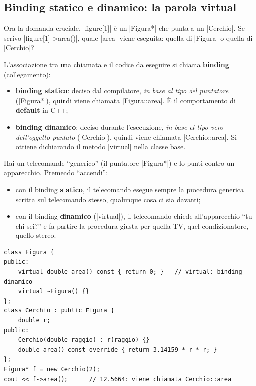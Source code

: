 \subsection*{Binding statico e dinamico: la parola virtual}

Ora la domanda cruciale. \cc|figure[1]| è un \cc|Figura*| che punta a un \cc|Cerchio|.
Se scrivo \cc|figure[1]->area()|, quale \cc|area| viene eseguita: quella di
\cc|Figura| o quella di \cc|Cerchio|?

L'associazione tra una chiamata e il codice da eseguire si chiama \textbf{binding}
(collegamento):
\begin{itemize}
  \item \textbf{binding statico}: deciso dal compilatore, \emph{in base al tipo del
        puntatore} (\cc|Figura*|), quindi viene chiamata \cc|Figura::area|. È il
        comportamento di \textbf{default} in C++;
  \item \textbf{binding dinamico}: deciso durante l'esecuzione, \emph{in base al tipo
        vero dell'oggetto puntato} (\cc|Cerchio|), quindi viene chiamata
        \cc|Cerchio::area|. Si ottiene dichiarando il metodo \cc|virtual| nella classe base.
\end{itemize}

\begin{analogia}
Hai un telecomando ``generico'' (il puntatore \cc|Figura*|) e lo punti contro un
apparecchio. Premendo ``accendi'':
\begin{itemize}
  \item con il binding \textbf{statico}, il telecomando esegue sempre la procedura
        generica scritta sul telecomando stesso, qualunque cosa ci sia davanti;
  \item con il binding \textbf{dinamico} (\cc|virtual|), il telecomando chiede
        all'apparecchio ``tu chi sei?'' e fa partire la procedura giusta per quella TV,
        quel condizionatore, quello stereo.
\end{itemize}
\end{analogia}

\begin{lstlisting}
class Figura {
public:
    virtual double area() const { return 0; }   // virtual: binding dinamico
    virtual ~Figura() {}
};
class Cerchio : public Figura {
    double r;
public:
    Cerchio(double raggio) : r(raggio) {}
    double area() const override { return 3.14159 * r * r; }
};
Figura* f = new Cerchio(2);
cout << f->area();      // 12.5664: viene chiamata Cerchio::area
\end{lstlisting}

